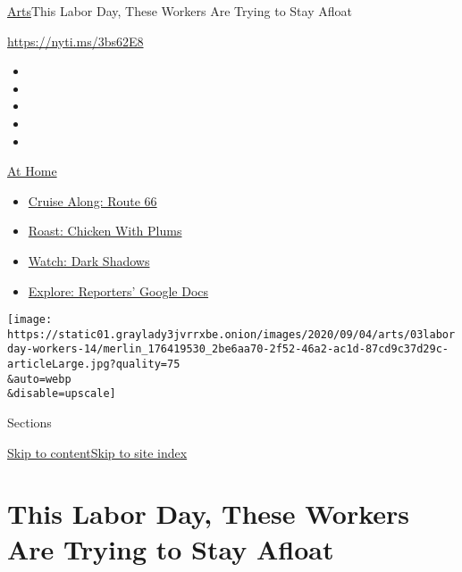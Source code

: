 \href{/section/arts}{Arts}\textbar{}This Labor Day, These Workers Are
Trying to Stay Afloat

\url{https://nyti.ms/3bs62E8}

\begin{itemize}
\item
\item
\item
\item
\item
\end{itemize}

\href{https://www.nytimes3xbfgragh.onion/spotlight/at-home?action=click\&pgtype=Article\&state=default\&region=TOP_BANNER\&context=at_home_menu}{At
Home}

\begin{itemize}
\tightlist
\item
  \href{https://www.nytimes3xbfgragh.onion/2020/09/07/travel/route-66.html?action=click\&pgtype=Article\&state=default\&region=TOP_BANNER\&context=at_home_menu}{Cruise
  Along: Route 66}
\item
  \href{https://www.nytimes3xbfgragh.onion/2020/09/04/dining/sheet-pan-chicken.html?action=click\&pgtype=Article\&state=default\&region=TOP_BANNER\&context=at_home_menu}{Roast:
  Chicken With Plums}
\item
  \href{https://www.nytimes3xbfgragh.onion/2020/09/04/arts/television/dark-shadows-stream.html?action=click\&pgtype=Article\&state=default\&region=TOP_BANNER\&context=at_home_menu}{Watch:
  Dark Shadows}
\item
  \href{https://www.nytimes3xbfgragh.onion/interactive/2020/at-home/even-more-reporters-editors-diaries-lists-recommendations.html?action=click\&pgtype=Article\&state=default\&region=TOP_BANNER\&context=at_home_menu}{Explore:
  Reporters' Google Docs}
\end{itemize}

\texttt{[image: https://static01.graylady3jvrrxbe.onion/images/2020/09/04/arts/03laborday-workers-14/merlin\_176419530\_2be6aa70-2f52-46a2-ac1d-87cd9c37d29c-articleLarge.jpg?quality=75\\\&auto=webp\\\&disable=upscale]}

Sections

\protect\hyperlink{site-content}{Skip to
content}\protect\hyperlink{site-index}{Skip to site index}

\hypertarget{this-labor-day-these-workers-are-trying-to-stay-afloat}{%
\section{This Labor Day, These Workers Are Trying to Stay
Afloat}\label{this-labor-day-these-workers-are-trying-to-stay-afloat}}

